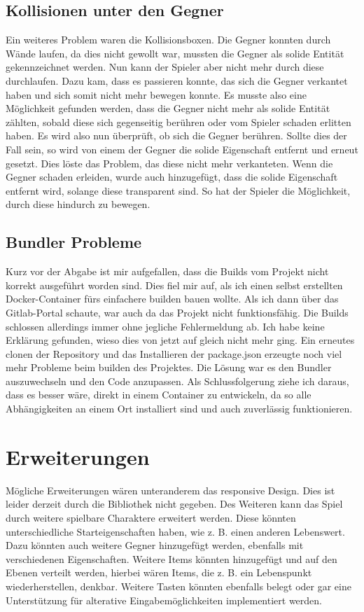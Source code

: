 \documentclass[12pt,a4paper]{article}
\begin{document}
\subsection{Kollisionen unter den Gegner}
Ein weiteres Problem waren die Kollisionsboxen. Die Gegner konnten durch Wände laufen, da dies nicht gewollt war, mussten die Gegner als \grqq solide\grqq{} Entität gekennzeichnet werden. Nun kann der Spieler aber nicht mehr durch diese durchlaufen. Dazu kam, dass es passieren konnte, das sich die Gegner verkantet haben und sich somit nicht mehr bewegen konnte. Es musste also eine Möglichkeit gefunden werden, dass die Gegner nicht mehr als solide Entität zählten, sobald diese sich gegenseitig berühren oder vom Spieler schaden erlitten haben. Es wird also nun überprüft, ob sich die Gegner berühren. Sollte dies der Fall sein, so wird von einem der Gegner die solide Eigenschaft entfernt und erneut gesetzt. Dies löste das Problem, das diese nicht mehr verkanteten. Wenn die Gegner schaden erleiden, wurde auch hinzugefügt, dass die solide Eigenschaft entfernt wird, solange diese transparent sind. So hat der Spieler die Möglichkeit, durch diese hindurch zu bewegen.

\subsection{Bundler Probleme}
Kurz vor der Abgabe ist mir aufgefallen, dass die Builds vom Projekt nicht korrekt ausgeführt worden sind. Dies fiel mir auf, als ich einen selbst erstellten Docker-Container fürs einfachere builden bauen wollte. Als ich dann über das Gitlab-Portal schaute, war auch da das Projekt nicht funktionsfähig. Die Builds schlossen allerdings immer ohne jegliche Fehlermeldung ab. Ich habe keine Erklärung gefunden, wieso dies von jetzt auf gleich nicht mehr ging. Ein erneutes clonen der Repository und das Installieren der package.json erzeugte noch viel mehr Probleme beim builden des Projektes. Die Lösung war es den Bundler auszuwechseln und den Code anzupassen. Als Schlussfolgerung ziehe ich daraus, dass es besser wäre, direkt in einem Container zu entwickeln, da so alle Abhängigkeiten an einem Ort installiert sind und auch zuverlässig funktionieren.

\section{Erweiterungen}
Mögliche Erweiterungen wären unteranderem das responsive Design. Dies ist leider derzeit durch die Bibliothek nicht gegeben. Des Weiteren kann das Spiel durch weitere spielbare Charaktere erweitert werden. Diese könnten unterschiedliche Starteigenschaften haben, wie z. B. einen anderen Lebenswert. Dazu könnten auch weitere Gegner hinzugefügt werden, ebenfalls mit verschiedenen Eigenschaften. Weitere Items könnten hinzugefügt und auf den Ebenen verteilt werden, hierbei wären Items, die z. B. ein Lebenspunkt wiederherstellen, denkbar. Weitere Tasten könnten ebenfalls belegt oder gar eine Unterstützung für alterative Eingabemöglichkeiten implementiert werden.
\end{document}
